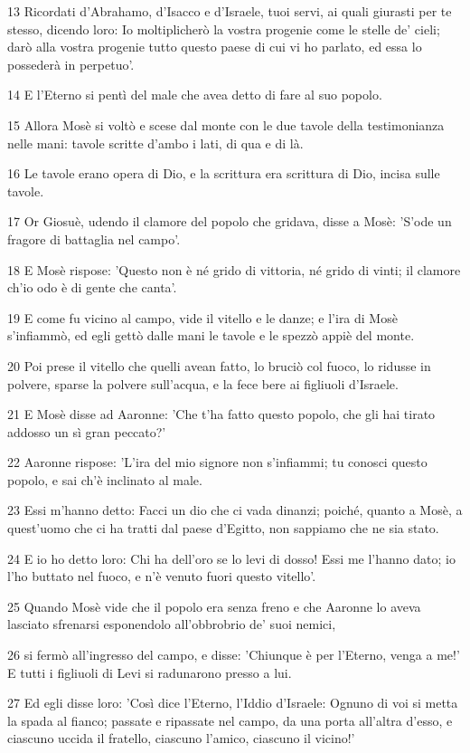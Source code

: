 \par 13 Ricordati d'Abrahamo, d'Isacco e d'Israele, tuoi servi, ai quali giurasti per te stesso, dicendo loro: Io moltiplicherò la vostra progenie come le stelle de' cieli; darò alla vostra progenie tutto questo paese di cui vi ho parlato, ed essa lo possederà in perpetuo'.
\par 14 E l'Eterno si pentì del male che avea detto di fare al suo popolo.
\par 15 Allora Mosè si voltò e scese dal monte con le due tavole della testimonianza nelle mani: tavole scritte d'ambo i lati, di qua e di là.
\par 16 Le tavole erano opera di Dio, e la scrittura era scrittura di Dio, incisa sulle tavole.
\par 17 Or Giosuè, udendo il clamore del popolo che gridava, disse a Mosè: 'S'ode un fragore di battaglia nel campo'.
\par 18 E Mosè rispose: 'Questo non è né grido di vittoria, né grido di vinti; il clamore ch'io odo è di gente che canta'.
\par 19 E come fu vicino al campo, vide il vitello e le danze; e l'ira di Mosè s'infiammò, ed egli gettò dalle mani le tavole e le spezzò appiè del monte.
\par 20 Poi prese il vitello che quelli avean fatto, lo bruciò col fuoco, lo ridusse in polvere, sparse la polvere sull'acqua, e la fece bere ai figliuoli d'Israele.
\par 21 E Mosè disse ad Aaronne: 'Che t'ha fatto questo popolo, che gli hai tirato addosso un sì gran peccato?'
\par 22 Aaronne rispose: 'L'ira del mio signore non s'infiammi; tu conosci questo popolo, e sai ch'è inclinato al male.
\par 23 Essi m'hanno detto: Facci un dio che ci vada dinanzi; poiché, quanto a Mosè, a quest'uomo che ci ha tratti dal paese d'Egitto, non sappiamo che ne sia stato.
\par 24 E io ho detto loro: Chi ha dell'oro se lo levi di dosso! Essi me l'hanno dato; io l'ho buttato nel fuoco, e n'è venuto fuori questo vitello'.
\par 25 Quando Mosè vide che il popolo era senza freno e che Aaronne lo aveva lasciato sfrenarsi esponendolo all'obbrobrio de' suoi nemici,
\par 26 si fermò all'ingresso del campo, e disse: 'Chiunque è per l'Eterno, venga a me!' E tutti i figliuoli di Levi si radunarono presso a lui.
\par 27 Ed egli disse loro: 'Così dice l'Eterno, l'Iddio d'Israele: Ognuno di voi si metta la spada al fianco; passate e ripassate nel campo, da una porta all'altra d'esso, e ciascuno uccida il fratello, ciascuno l'amico, ciascuno il vicino!'
